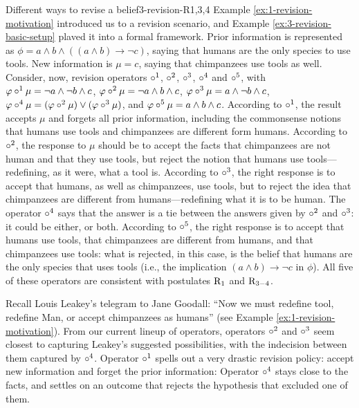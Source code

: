 \begin{xmpl}{Different ways to revise a belief}{3-revision-R1,3,4}
	Example \ref{ex:1-revision-motivation} introduced us to a revision scenario,
	and Example \ref{ex:3-revision-basic-setup}
	plaved it into a formal framework.
	Prior information is represented as 
	$\phi = a\land b\land ((a\land b)\rightarrow\lnot c)$,
	saying that humans are the only species to use tools.
	New information is $\mu=c$, saying that chimpanzees use tools as well.
	Consider, now, revision operators 
	$\circ^1$, $\circ^2$, $\circ^3$, $\circ^4$ and $\circ^5$,
	with 
	$\varphi\circ^1\mu = \lnot a\land \lnot b\land c$,
	$\varphi\circ^2\mu = \lnot a\land b\land c$,
	$\varphi\circ^3\mu = a\land \lnot b\land c$,
	$\varphi\circ^4\mu = (\varphi\circ^2\mu)\lor(\varphi\circ^3\mu)$,
	and 
	$\varphi\circ^5\mu = a\land b\land c$.
	According to $\circ^1$, the result accepts $\mu$ and forgets all prior information,
	including the commonsense notions that humans use tools and chimpanzees are different form humans.
	According to $\circ^2$, the response to $\mu$ should be to accept the facts that chimpanzees are not human 
	and that they use tools, but reject the notion that humans use tools---redefining, as it were, what a tool is.
	According to $\circ^3$, the right response is to accept that humans, as well as chimpanzees, use tools,
	but to reject the idea that chimpanzees are different from humans---redefining what it is to be human.
	The operator $\circ^4$ says that the answer is a tie between the answers given by $\circ^2$ and $\circ^3$:
	it could be either, or both.
	According to $\circ^5$, the right response is to accept that humans use tools, that chimpanzees are different from humans,
	and that chimpanzees use tools: what is rejected, in this case, is the belief that humans are the only species 
	that uses tools (i.e., the implication $(a\land b)\rightarrow\lnot c$ in $\phi$).
	All five of these operators are consistent with postulates $\mathrm{R}_{1}$ and $\mathrm{R}_{3-4}$.

	Recall Louis Leakey's telegram to Jane Goodall:
	``Now we must redefine tool, redefine Man, or accept chimpanzees as humans'' (see Example \ref{ex:1-revision-motivation}).
	From our current lineup of operators, 
	operators $\circ^2$ and $\circ^3$ seem closest to capturing Leakey's suggested possibilities,
	with the indecision between them captured by $\circ^4$.
	Operator $\circ^1$ spells out a very drastic revision policy: accept new information and forget the prior information:
	Operator $\circ^4$ stays close to the facts, and settles on an outcome that rejects the hypothesis that excluded one of them.
\end{xmpl}

